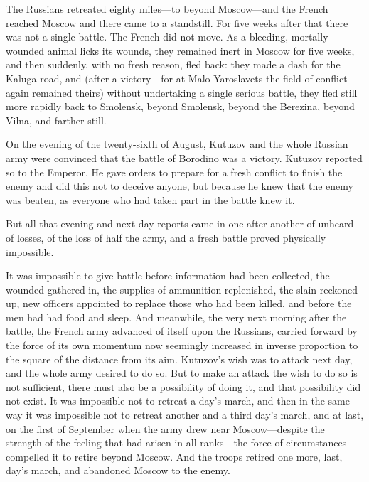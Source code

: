 The Russians retreated eighty miles---to beyond Moscow---and the
French reached Moscow and there came to a standstill. For five
weeks after that there was not a single battle. The French did
not move. As a bleeding, mortally wounded animal licks its
wounds, they remained inert in Moscow for five weeks, and then
suddenly, with no fresh reason, fled back: they made a dash for
the Kaluga road, and (after a victory---for at Malo-Yaroslavets
the field of conflict again remained theirs) without undertaking
a single serious battle, they fled still more rapidly back to
Smolensk, beyond Smolensk, beyond the Berezina, beyond Vilna, and
farther still.

On the evening of the twenty-sixth of August, Kutuzov and the
whole Russian army were convinced that the battle of Borodino was
a victory.  Kutuzov reported so to the Emperor. He gave orders to
prepare for a fresh conflict to finish the enemy and did this not
to deceive anyone, but because he knew that the enemy was beaten,
as everyone who had taken part in the battle knew it.

But all that evening and next day reports came in one after
another of unheard-of losses, of the loss of half the army, and a
fresh battle proved physically impossible.

It was impossible to give battle before information had been
collected, the wounded gathered in, the supplies of ammunition
replenished, the slain reckoned up, new officers appointed to
replace those who had been killed, and before the men had had
food and sleep. And meanwhile, the very next morning after the
battle, the French army advanced of itself upon the Russians,
carried forward by the force of its own momentum now seemingly
increased in inverse proportion to the square of the distance
from its aim. Kutuzov's wish was to attack next day, and the
whole army desired to do so. But to make an attack the wish to do
so is not sufficient, there must also be a possibility of doing
it, and that possibility did not exist. It was impossible not to
retreat a day's march, and then in the same way it was impossible
not to retreat another and a third day's march, and at last, on
the first of September when the army drew near Moscow---despite
the strength of the feeling that had arisen in all ranks---the
force of circumstances compelled it to retire beyond Moscow. And
the troops retired one more, last, day's march, and abandoned
Moscow to the enemy.

